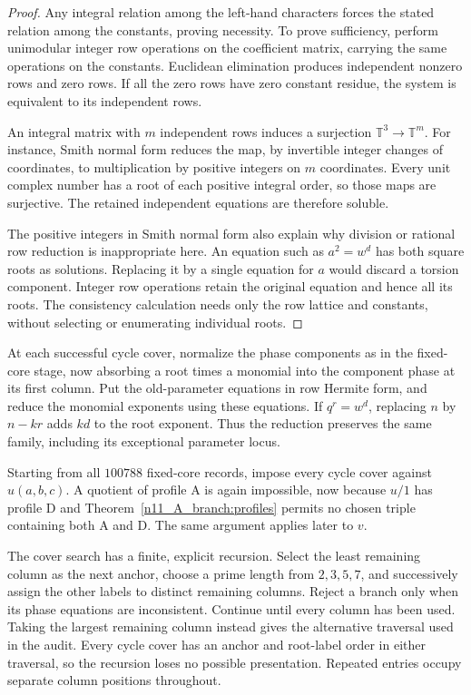 \documentclass[11pt,a4paper]{article}
\theoremstyle{plain}
\theoremstyle{definition}
\theoremstyle{plain}
\begin{document}
\begin{proof}
Any integral relation among the left-hand characters forces the stated relation among the constants, proving necessity. To prove sufficiency, perform unimodular integer row operations on the coefficient matrix, carrying the same operations on the constants. Euclidean elimination produces independent nonzero rows and zero rows. If all the zero rows have zero constant residue, the system is equivalent to its independent rows.

An integral matrix with $m$ independent rows induces a surjection $\mathbb T^3\to\mathbb T^m$. For instance, Smith normal form reduces the map, by invertible integer changes of coordinates, to multiplication by positive integers on $m$ coordinates. Every unit complex number has a root of each positive integral order, so those maps are surjective. The retained independent equations are therefore soluble.

The positive integers in Smith normal form also explain why division or rational row reduction is inappropriate here. An equation such as $a^2=w^d$ has both square roots as solutions. Replacing it by a single equation for $a$ would discard a torsion component. Integer row operations retain the original equation and hence all its roots. The consistency calculation needs only the row lattice and constants, without selecting or enumerating individual roots.
\end{proof}

At each successful cycle cover, normalize the phase components as in the fixed-core stage, now absorbing a root times a monomial into the component phase at its first column. Put the old-parameter equations in row Hermite form, and reduce the monomial exponents using these equations. If $q^r=w^d$, replacing $n$ by $n-kr$ adds $kd$ to the root exponent. Thus the reduction preserves the same family, including its exceptional parameter locus.

\medskip
Starting from all $100788$ fixed-core records, impose every cycle cover against $u(a,b,c)$. A quotient of profile $\mathrm{A}$ is again impossible, now because $u/1$ has profile $\mathrm{D}$ and Theorem~\ref{n11_A_branch:profiles} permits no chosen triple containing both $\mathrm{A}$ and $\mathrm{D}$. The same argument applies later to $v$.

The cover search has a finite, explicit recursion. Select the least remaining column as the next anchor, choose a prime length from $2,3,5,7$, and successively assign the other labels to distinct remaining columns. Reject a branch only when its phase equations are inconsistent. Continue until every column has been used. Taking the largest remaining column instead gives the alternative traversal used in the audit. Every cycle cover has an anchor and root-label order in either traversal, so the recursion loses no possible presentation. Repeated entries occupy separate column positions throughout.
\end{document}
